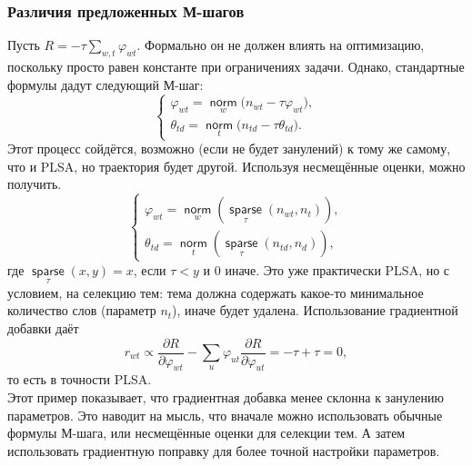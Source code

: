 \documentclass[12pt]{article}
\renewcommand{\phi}{\varphi}
\newcommand{\norm}{\mathop{\mathsf{norm}}\limits}
\newcommand{\sparse}{\mathop{\mathsf{sparse}}\limits}
\begin{document}
 \subsubsection{Различия предложенных М-шагов}
Пусть $R = -\tau \sum\limits_{w, t} \phi_{wt}$. Формально он не должен влиять на оптимизацию, поскольку просто равен константе при ограничениях задачи. Однако, стандартные формулы дадут следующий М-шаг:
\[
\left\{
	\begin{aligned}
		\phi_{wt} = \norm_w \bigl( n_{wt} - \tau \phi_{wt}\bigr),\\
		\theta_{td} = \norm_t \bigl( n_{td} - \tau \theta_{td}\bigr).
	\end{aligned}
\right.
\]
Этот процесс сойдётся, возможно (если не будет занулений) к тому же самому, что и PLSA, но траектория будет другой. Используя несмещённые оценки, можно получить.
\[
\left\{
	\begin{aligned}
		\phi_{wt} = \norm_w (\sparse_{\tau}(n_{wt}, n_{t})),\\
		\theta_{td} = \norm_t (\sparse_{\tau}(n_{td}, n_{d})),
	\end{aligned}
\right.
\]
где $\sparse_{\tau}(x, y) = x$, если $\tau < y$ и $0$ иначе. Это уже практически PLSA, но с условием, на селекцию тем: тема должна содержать какое-то минимальное количество слов (параметр $n_t$), иначе будет удалена.
Использование градиентной добавки даёт 
\[
r_{wt} \propto \frac{\partial{R}}{\partial{\phi_{wt}}} - \sum\limits_u \phi_{ut} \frac{\partial{R}}{\partial{\phi_{ut}}} = -\tau + \tau =0,
\]
то есть в точности PLSA.\\

Этот пример показывает, что градиентная добавка менее склонна к занулению параметров. Это наводит на мысль, что вначале можно использовать обычные формулы М-шага, или несмещённые оценки для селекции тем. А затем использовать градиентную поправку для более точной настройки параметров.\\
\end{document}

